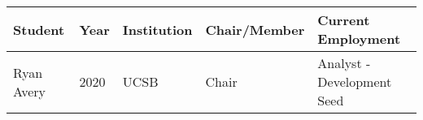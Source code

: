 
\begin{longtable}{lp{1.5cm} p{2cm}p{2.5cm}p{7.5cm}}
Student & Year & Institution & Chair/Member & Current Employment\\
\hline 
\endhead 
Ryan Avery & 2020 & UCSB & Chair & Analyst  -  Development Seed \\
\end{longtable}


